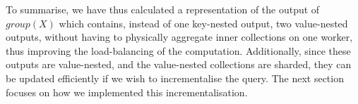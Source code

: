 To summarise, we have thus calculated a representation of the output of $group(X)$ which contains, instead of one key-nested output, two value-nested outputs, without having to physically aggregate inner collections on one worker, thus improving the load-balancing of the computation. Additionally, since these outputs are value-nested, and the value-nested collections are sharded, they can be updated efficiently if we wish to incrementalise the query. The next section focuses on how we implemented this incrementalisation.